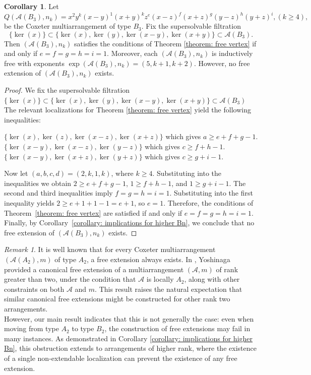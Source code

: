 \documentclass[12pt]{amsart}
\theoremstyle{definition}
\newtheorem{corollary}[theorem]{Corollary}
\theoremstyle{remark}
\newtheorem{remark}[theorem]{Remark}
\newcommand\CA{{\mathscr A}}
\begin{document}
\begin{corollary}\label{corollary: B3 non extendable example}
    Let $$Q(\CA(B_3),n_k)=x^2 y^k (x-y)^1 (x+y)^k z^e (x-z)^f (x+z)^g (y-z)^h (y+z)^i, (k\geq 4),$$ be the Coxeter multiarrangement of type $B_3$. Fix the supersolvable filtration $$\{\ker(x)\}\subset \{\ker(x), \ker(y), \ker(x-y), \ker(x+y)\}\subset \CA(B_3).$$ Then $(\CA(B_3),n_k)$ satisfies the conditions of Theorem \ref{theorem: free vertex} if and only if $e=f=g=h=i=1$. Moreover, each $(\CA(B_3),n_k)$ is inductively free with exponents $\exp(\CA(B_3),n_k)=(5,k+1,k+2)$. However, no free extension of $(\CA(B_3),n_k)$ exists.
\end{corollary}
\begin{proof}
    We fix the supersolvable filtration $\{\ker(x)\}\subset \{\ker(x), \ker(y), \ker(x-y), \ker(x+y)\}\subset \CA(B_3)$ The relevant localizations for Theorem \ref{theorem: free vertex} yield the following inequalities:
    \begin{center}
    $\{\ker(x),\ker(z),\ker(x-z),\ker(x+z)\}$ which gives $a\geq e+f+g-1$.\\
    $\{\ker(x-y),\ker(x-z),\ker(y-z)\}$ which gives $c\geq f+h-1$.\\
    $\{\ker(x-y),\ker(x+z),\ker(y+z)\}$ which gives $c\geq g+i-1$.
    \end{center}
    Now let $(a,b,c,d)=(2,k,1,k)$, where $k\geq 4$. Substituting into the inequalities we obtain $2\geq e+f+g-1$, $1\geq f+h-1$, and $1\geq g+i-1$. The second and third inequalities imply $f=g=h=i=1$. Substituting into the first inequality yields $2\geq e+1+1-1=e+1$, so $e=1$. Therefore, the conditions of Theorem~\ref{theorem: free vertex} are satisfied if and only if $e = f = g = h = i = 1$. Finally, by Corollary~\ref{corollary: implications for higher Bn}, we conclude that no free extension of $(\mathcal{A}(B_3), n_k)$ exists.
\end{proof}

\begin{remark}
    It is well known that for every Coxeter multiarrangement $(\CA(A_2),m)$ of type $A_2$, a free extension always exists. In \cite{MR3025868}, Yoshinaga provided a canonical free extension of a multiarrangement $(\CA,m)$ of rank greater than two, under the condition that $\CA$ is locally $A_2$, along with other constraints on both $\CA$ and $m$. This result raises the natural expectation that similar canonical free extensions might be constructed for other rank two arrangements.\\
    However, our main result indicates that this is not generally the case: even when moving from type $A_2$ to type $B_2$, the construction of free extensions may fail in many instances. As demonstrated in Corollary \ref{corollary: implications for higher Bn}, this obstruction extends to arrangements of higher rank, where the existence of a single non-extendable localization can prevent the existence of any free extension.
\end{remark}
\end{document}
